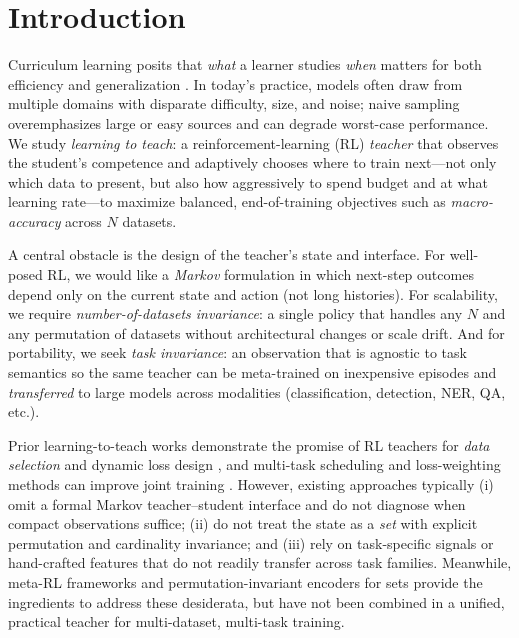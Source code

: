 \documentclass[11pt]{article}
\newcommand{\1}{\mathbf{1}}
\begin{document}
\section{Introduction}
Curriculum learning posits that \emph{what} a learner studies \emph{when} matters for both efficiency and generalization \citep{bengio2009curriculum,kumar2010selfpaced}. In today’s practice, models often draw from multiple domains with disparate difficulty, size, and noise; naive sampling overemphasizes large or easy sources and can degrade worst-case performance. We study \emph{learning to teach}: a reinforcement-learning (RL) \emph{teacher} that observes the student’s competence and adaptively chooses where to train next---not only which data to present, but also how aggressively to spend budget and at what learning rate---to maximize balanced, end-of-training objectives such as \emph{macro-accuracy} across $N$ datasets.

A central obstacle is the design of the teacher’s state and interface. For well-posed RL, we would like a \emph{Markov} formulation in which next-step outcomes depend only on the current state and action (not long histories). For scalability, we require \emph{number-of-datasets invariance}: a single policy that handles any $N$ and any permutation of datasets without architectural changes or scale drift. And for portability, we seek \emph{task invariance}: an observation that is agnostic to task semantics so the same teacher can be meta-trained on inexpensive episodes and \emph{transferred} to large models across modalities (classification, detection, NER, QA, etc.).

Prior learning-to-teach works demonstrate the promise of RL teachers for \emph{data selection} \citep{fan2018l2t} and dynamic loss design \citep{wu2018l2tloss}, and multi-task scheduling and loss-weighting methods can improve joint training \citep{kendall2018uncertainty,chen2018gradnorm}. However, existing approaches typically (i) omit a formal Markov teacher--student interface and do not diagnose when compact observations suffice; (ii) do not treat the state as a \emph{set} with explicit permutation and cardinality invariance; and (iii) rely on task-specific signals or hand-crafted features that do not readily transfer across task families. Meanwhile, meta-RL frameworks \citep{duan2016rl2,finn2017maml} and permutation-invariant encoders for sets \citep{zaheer2017deepsets,lee2019settransformer} provide the ingredients to address these desiderata, but have not been combined in a unified, practical teacher for multi-dataset, multi-task training.
\end{document}
